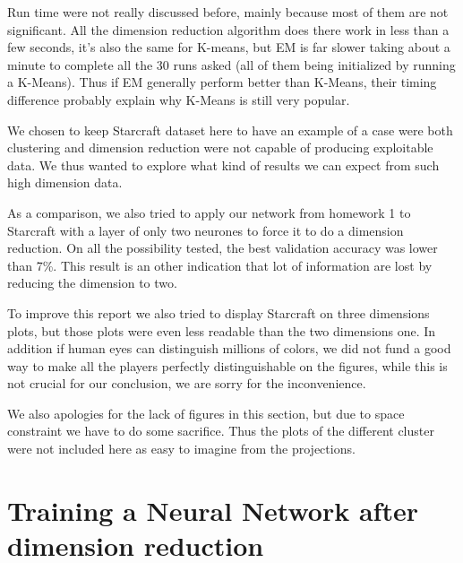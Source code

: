 \documentclass[twocolumn,a4paper,10pt]{article}
\begin{document}
Run time were not really discussed before, mainly because most of
them are not significant. All the dimension reduction algorithm does
there work in less than a few seconds, it's also the same for K-means,
but EM is far slower taking about a minute to complete all the 30
runs asked (all of them being initialized by running a K-Means). Thus
if EM generally perform better than K-Means, their timing difference
probably explain why K-Means is still very popular.

We chosen to keep Starcraft dataset here to have an example of a case
were both clustering and dimension reduction were not capable of producing
exploitable data. We thus wanted to explore what kind of results we
can expect from such high dimension data. %

As a comparison, we also tried to apply our network from homework
1 to Starcraft with a layer of only two neurones to force it to do
a dimension reduction. On all the possibility tested, the best validation
accuracy was lower than 7\%. This result is an other indication that
lot of information are lost by reducing the dimension to two.

To improve this report we also tried to display Starcraft on three
dimensions plots, but those plots were even less readable than the
two dimensions one. In addition if human eyes can distinguish millions
of colors, we did not fund a good way to make all the players perfectly
distinguishable on the figures, while this is not crucial for our
conclusion, we are sorry for the inconvenience.

We also apologies for the lack of figures in this section, but due
to space constraint we have to do some sacrifice. Thus the plots of
the different cluster were not included here as easy to imagine from
the projections.


\section{Training a Neural Network after dimension reduction}

\label{nn} 

\paragraph{}
\end{document}
